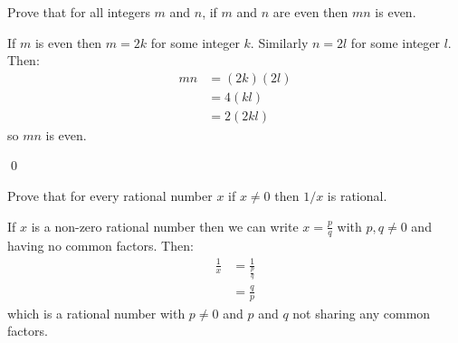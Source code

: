 \documentclass[addpoints]{exam}
\begin{document}
\begin{questions}

  \question Prove that for all integers $m$ and $n$, if $m$ and $n$ are even then $mn$ is even.
  \vspace*{\fill}
  \begin{solution}
    If $m$ is even then $m = 2k$ for some integer $k$. Similarly $n = 2l$ for some integer $l$. Then:
    \begin{align*}
      mn &= (2k)(2l)\\
      &= 4(kl)\\
      &= 2(2kl)
    \end{align*}
    so $mn$ is even.

    \qed
  \end{solution}

  \question Prove that for every rational number $x$ if $x\not= 0$ then $1/x$ is rational.

  \vspace*{\fill}
  \begin{solution}
    If $x$ is a non-zero rational number then we can write $x = \frac{p}{q}$ with $p,q \not =0$ and having no common factors. Then:
    \begin{align*}
      \frac{1}{x} &= \frac{1}{\frac{p}{q}}\\
      &= \frac{q}{p}
    \end{align*}
    which is a rational number with $p\not=0$ and $p$ and $q$ not sharing any common factors.


\end{solution}
\end{questions}
\end{document}
